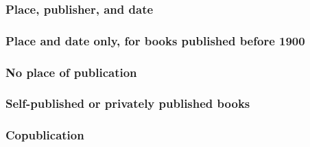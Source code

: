 \documentclass[11pt,letterpaper,oneside]{article}
\begin{document}
\subsubsection{Place, publisher, and date}

\begin{citebib}
\item \cite{woolf1927}
\end{citebib}

\subsubsection{Place and date only, for books published before 1900}

\begin{citebib}
\item \cite{goldsmith1766}
\item \cite{cervantes1605}
\end{citebib}

\setcounter{subsubsection}{131}
\subsubsection{No place of publication}

\begin{citebib}
\item \cite{windsor1910}
\item \cite{vliet1890}
\end{citebib}

\setcounter{subsubsection}{136}
\subsubsection{Self-published or privately published books}

\begin{citebib}
\item \cite{karavaev2015}
\item \cite{shumaker2014}
\end{citebib}

\setcounter{subsubsection}{139}
\subsubsection{Copublication}
\end{document}
